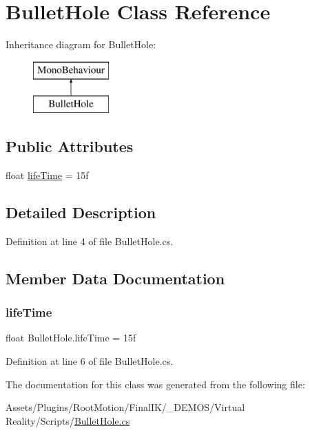 \hypertarget{class_bullet_hole}{}\section{Bullet\+Hole Class Reference}
\label{class_bullet_hole}
Inheritance diagram for Bullet\+Hole\+:\begin{figure}[H]
\begin{center}
\leavevmode
\includegraphics[height=2.000000cm]{class_bullet_hole}
\end{center}
\end{figure}
\subsection*{Public Attributes}
\begin{DoxyCompactItemize}
\item 
float \mbox{\hyperlink{class_bullet_hole_a9347e20ea02f68202c5b2924ca183268}{life\+Time}} = 15f
\end{DoxyCompactItemize}


\subsection{Detailed Description}


Definition at line 4 of file Bullet\+Hole.\+cs.



\subsection{Member Data Documentation}
\mbox{\label{class_bullet_hole_a9347e20ea02f68202c5b2924ca183268}} 
\subsubsection{\texorpdfstring{life\+Time}{lifeTime}}
{\footnotesize\ttfamily float Bullet\+Hole.\+life\+Time = 15f}



Definition at line 6 of file Bullet\+Hole.\+cs.



The documentation for this class was generated from the following file\+:\begin{DoxyCompactItemize}
\item 
Assets/\+Plugins/\+Root\+Motion/\+Final\+I\+K/\+\_\+\+D\+E\+M\+O\+S/\+Virtual Reality/\+Scripts/\mbox{\hyperlink{_bullet_hole_8cs}{Bullet\+Hole.\+cs}}\end{DoxyCompactItemize}
